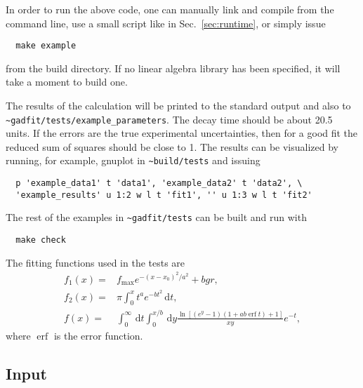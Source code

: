 \documentclass{article}
\newcommand{\D}{\,\textrm{d}}
\DeclareMathOperator{\erf}{erf}
\begin{document}
In order to run the above code, one can manually link and compile from
the command line, use a small script like in Sec.~\ref{sec:runtime},
or simply issue
\begin{verbatim}
  make example
\end{verbatim}
from the build directory. If no linear algebra library has been
specified, it will take a moment to build one.

The results of the calculation will be printed to the standard output
and also to \verb+~gadfit/tests/example_parameters+. The decay time
should be about 20.5 units. If the errors are the true experimental
uncertainties, then for a good fit the reduced sum of squares should
be close to 1. The results can be visualized by running, for example,
gnuplot in \verb+~build/tests+ and issuing
\begin{verbatim}
  p 'example_data1' t 'data1', 'example_data2' t 'data2', \
  'example_results' u 1:2 w l t 'fit1', '' u 1:3 w l t 'fit2'
\end{verbatim}
The rest of the examples in \verb+~gadfit/tests+ can be built and run
with
\begin{verbatim}
  make check
\end{verbatim}
The fitting functions used in the tests are
\begin{equation*}
  \begin{split}
    f_1(x) =& f_{\text{max}}e^{-(x-x_0)^2/a^2}+bgr, \\
    f_2(x) =& \pi \int_0^x t^ae^{-bt^2} \D t, \\
    f(x) =& \int_0^\infty \D t \int_0^{x/b} \D y
    \frac{\ln[(e^y-1)(1+ab \erf t)+1]}{xy} e^{-t},
  \end{split}
\end{equation*}
where $\erf$ is the error function.

\subsection{\label{sec:input}Input}
\end{document}
